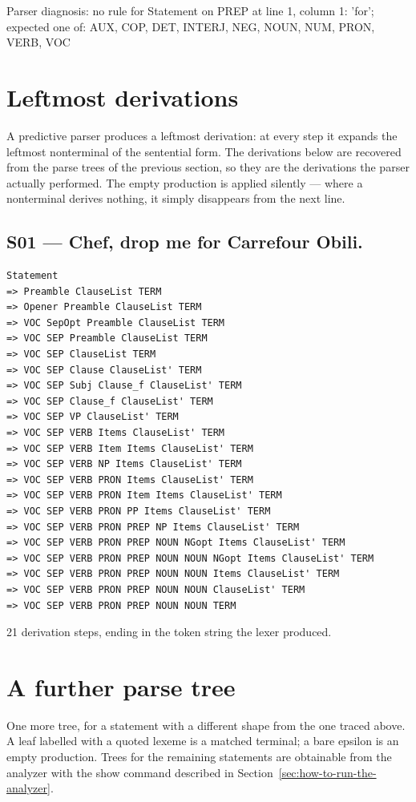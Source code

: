 \documentclass[11pt,a4paper]{article}
\newcommand{\vbfmt}{\color{ink!88}}
\begin{document}
Parser diagnosis: no rule for Statement on PREP at line 1, column 1: 'for'; expected one of: AUX, COP, DET, INTERJ, NEG, NOUN, NUM, PRON, VERB, VOC

\section{Leftmost derivations}
\label{sec:leftmost-derivations}
A predictive parser produces a leftmost derivation: at every step it expands the leftmost nonterminal of the sentential form. The derivations below are recovered from the parse trees of the previous section, so they are the derivations the parser actually performed. The empty production is applied silently --- where a nonterminal derives nothing, it simply disappears from the next line.

\subsection{S01 --- Chef, drop me for Carrefour Obili.}
\begin{Verbatim}[commandchars=\\\{\},fontsize=\small,formatcom=\vbfmt,frame=leftline,framerule=1.2pt,rulecolor=\color{clay!55},framesep=6pt,xleftmargin=10pt,xrightmargin=4pt]
Statement
=> Preamble ClauseList TERM
=> Opener Preamble ClauseList TERM
=> VOC SepOpt Preamble ClauseList TERM
=> VOC SEP Preamble ClauseList TERM
=> VOC SEP ClauseList TERM
=> VOC SEP Clause ClauseList' TERM
=> VOC SEP Subj Clause_f ClauseList' TERM
=> VOC SEP Clause_f ClauseList' TERM
=> VOC SEP VP ClauseList' TERM
=> VOC SEP VERB Items ClauseList' TERM
=> VOC SEP VERB Item Items ClauseList' TERM
=> VOC SEP VERB NP Items ClauseList' TERM
=> VOC SEP VERB PRON Items ClauseList' TERM
=> VOC SEP VERB PRON Item Items ClauseList' TERM
=> VOC SEP VERB PRON PP Items ClauseList' TERM
=> VOC SEP VERB PRON PREP NP Items ClauseList' TERM
=> VOC SEP VERB PRON PREP NOUN NGopt Items ClauseList' TERM
=> VOC SEP VERB PRON PREP NOUN NOUN NGopt Items ClauseList' TERM
=> VOC SEP VERB PRON PREP NOUN NOUN Items ClauseList' TERM
=> VOC SEP VERB PRON PREP NOUN NOUN ClauseList' TERM
=> VOC SEP VERB PRON PREP NOUN NOUN TERM
\end{Verbatim}
21 derivation steps, ending in the token string the lexer produced.

\section{A further parse tree}
\label{sec:a-further-parse-tree}
One more tree, for a statement with a different shape from the one traced above. A leaf labelled with a quoted lexeme is a matched terminal; a bare epsilon is an empty production. Trees for the remaining statements are obtainable from the analyzer with the show command described in Section~\ref{sec:how-to-run-the-analyzer}.
\end{document}
